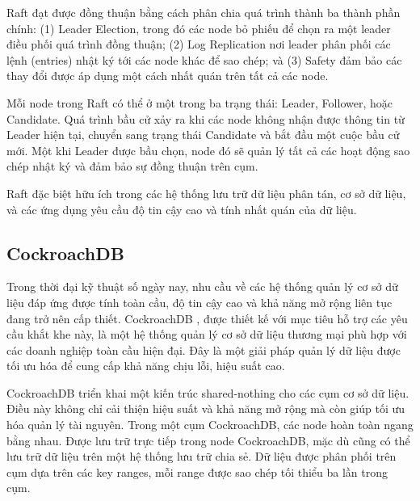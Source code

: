 \documentclass[50pt]{extarticle}
\begin{document}
Raft đạt được đồng thuận bằng cách phân chia quá trình thành ba thành phần chính: (1) Leader Election, trong đó các node bỏ phiếu để chọn ra một leader điều phối quá trình đồng thuận; (2) Log Replication nơi leader phân phối các lệnh (entries) nhật ký tới các node khác để sao chép; và (3) Safety đảm bảo các thay đổi được áp dụng một cách nhất quán trên tất cả các node.

Mỗi node trong Raft có thể ở một trong ba trạng thái: Leader, Follower, hoặc Candidate. Quá trình bầu cử xảy ra khi các node không nhận được thông tin từ Leader hiện tại, chuyển sang trạng thái Candidate và bắt đầu một cuộc bầu cử mới. Một khi Leader được bầu chọn, node đó sẽ quản lý tất cả các hoạt động sao chép nhật ký và đảm bảo sự đồng thuận trên cụm.

Raft đặc biệt hữu ích trong các hệ thống lưu trữ dữ liệu phân tán, cơ sở dữ liệu, và các ứng dụng yêu cầu độ tin cậy cao và tính nhất quán của dữ liệu.



\subsection{CockroachDB}

Trong thời đại kỹ thuật số ngày nay, nhu cầu về các hệ thống quản lý cơ sở dữ liệu đáp ứng được tính toàn cầu, độ tin cậy cao và khả năng mở rộng liên tục đang trở nên cấp thiết. CockroachDB \cite{taft2020cockroachdb}, được thiết kế với mục tiêu hỗ trợ các yêu cầu khắt khe này, là một hệ thống quản lý cơ sở dữ liệu thương mại phù hợp với các doanh nghiệp toàn cầu hiện đại. Đây là một giải pháp quản lý dữ liệu được tối ưu hóa để cung cấp khả năng chịu lỗi, hiệu suất cao.



CockroachDB triển khai một kiến trúc shared-nothing cho các cụm cơ sở dữ liệu. Điều này không chỉ cải thiện hiệu suất và khả năng mở rộng mà còn giúp tối ưu hóa quản lý tài nguyên. Trong một cụm CockroachDB, các node hoàn toàn ngang bằng nhau. Được lưu trữ trực tiếp trong node CockroachDB, mặc dù cũng có thể lưu trữ dữ liệu trên một hệ thống lưu trữ chia sẻ. Dữ liệu được phân phối trên cụm dựa trên các key ranges, mỗi range được sao chép tối thiểu ba lần trong cụm.
\end{document}
